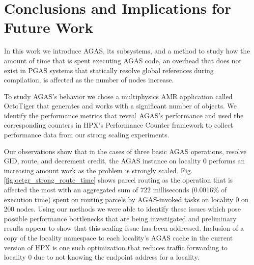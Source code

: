 \section{Conclusions and Implications for Future Work}
\label{conclusions}

%

In this work we introduce AGAS, its subsystems, and a method to study how the
amount of time that is spent executing AGAS code, an overhead that does not
exist in PGAS systems that statically resolve global references during
compilation, is affected as the number of nodes increase.

To study AGAS's behavior we chose a multiphysics AMR application called
OctoTiger that generates and works with a significant number of objects. We
identify the performance metrics that reveal AGAS's performance and used the
corresponding counters in HPX's Performance Counter framework to collect
performance data from our strong scaling experiments.

Our observations show that in the cases of three basic AGAS operations, resolve
GID, route, and decrement credit, the AGAS instance on locality 0 performs an
increasing amount work as the problem is strongly scaled. Fig.
\ref{fig:octgr_strong_route_time} shows parcel routing as the operation that is
affected the most with an aggregated sum of $722$ milliseconds (0.0016\% of
execution time) spent on routing parcels by AGAS-invoked tasks on locality 0 on
200 nodes. Using our methods we were able to identify these issues which pose possible
performance bottlenecks that are being investigated and preliminary results
appear to show that this scaling issue has been addressed. Inclusion of a copy
of the locality namespace to each locality's AGAS cache in the current version
of HPX is one such optimization that reduces traffic forwarding to locality 0
due to not knowing the endpoint address for a locality.

